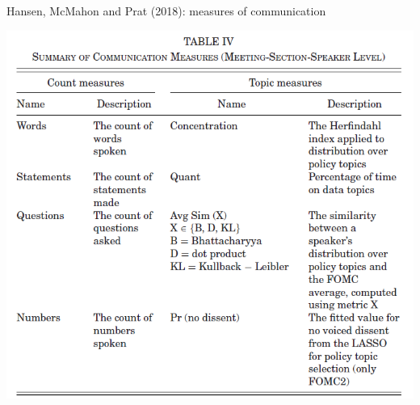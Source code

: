 \documentclass[english]{beamer}
\begin{document}
\begin{frame}{\small{Hansen, McMahon and Prat (2018): measures of communication}}
\vspace{-7pt}
\begin{center}
\includegraphics[scale=0.4]{Images/hansen2018c.png}
\end{center}
\end{frame}

\end{document}
